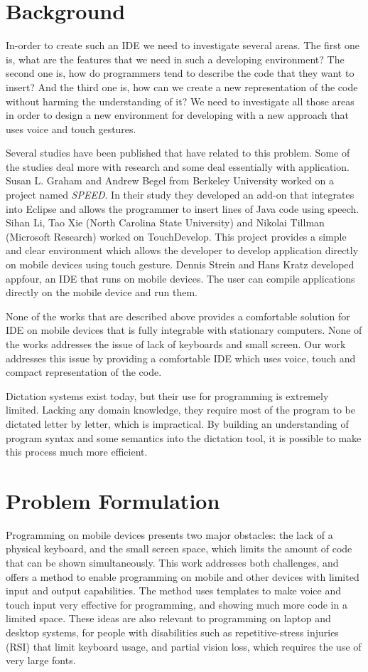 \section{Background}
In-order to create such an IDE we need to investigate several areas. The first one is, what are the features that we need in such a developing environment? The second one is, how do programmers tend to describe the code that they want to insert? And the third one is, how can we create a new representation of the code without harming the understanding of it? We need to investigate all those areas in order to design a new environment for developing with a new approach that uses voice and touch gestures.

Several studies have been published that have related to this problem. Some of the studies deal more with research and some deal essentially with application. Susan L. Graham and Andrew Begel from Berkeley University worked on a project named \textit{SPEED}. In their study they developed an add-on that integrates into Eclipse and allows the programmer to insert lines of Java code using speech. Sihan Li, Tao Xie (North Carolina State University) and Nikolai Tillman (Microsoft Research) worked on TouchDevelop. This project provides a simple and clear environment which allows the developer to develop application directly on mobile devices using touch gesture. Dennis Strein and Hans Kratz developed appfour, an IDE that runs on mobile devices. The user can compile applications directly on the  mobile device and run them.

None of the works that are described above provides a comfortable solution for IDE on mobile devices that is fully integrable with stationary computers. None of the works addresses the issue of lack of keyboards and small screen. 	Our work addresses this issue by providing a comfortable IDE which uses voice, touch and compact representation of the code.

Dictation systems exist today, but their use for programming is extremely limited. Lacking any domain knowledge, they require most of the program to be dictated letter by letter, which is impractical. By building an understanding of program syntax and some semantics into the dictation tool, it is possible to make this process much more efficient.
\section{Problem Formulation}
Programming on mobile devices presents two major obstacles: the lack of a physical keyboard, and the small screen space, which limits the amount of code that can be shown simultaneously. This work addresses both challenges, and offers a method to enable programming on mobile and other devices with limited input and output capabilities. The method uses templates to make voice and touch input very effective for programming, and showing much more code in a limited space. These ideas are also relevant to programming on laptop and desktop systems, for people with disabilities such as repetitive-stress injuries (RSI) that limit keyboard usage, and partial vision loss, which requires the use of very large fonts. 

